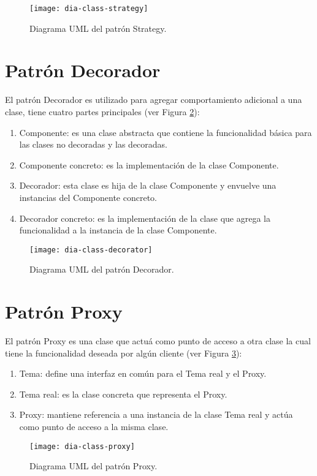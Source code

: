 \begin{figure}[h]
  \centering
  \texttt{[image: dia-class-strategy]}
  \caption{Diagrama UML del patrón Strategy\cite{DesignPatternsLasater}.}
  \label{fig:dia-class-strategy}
\end{figure}

\section{Patrón Decorador}
El patrón Decorador es utilizado para agregar comportamiento adicional a una clase, tiene cuatro partes principales\cite{DesignPatternsLasater} (ver Figura \ref{fig:dia-class-decorator}):
\begin{enumerate}
  \item Componente: es una clase abstracta que contiene la funcionalidad básica para las clases no decoradas y las decoradas.
  \item Componente concreto: es la implementación de la clase Componente.
  \item Decorador: esta clase es hija de la clase Componente y envuelve una instancias del Componente concreto.
  \item Decorador concreto: es la implementación de la clase que agrega la funcionalidad a la instancia de la clase Componente.
\end{enumerate}

\begin{figure}[h]
  \centering
  \texttt{[image: dia-class-decorator]}
  \caption{Diagrama UML del patrón Decorador\cite{DesignPatternsLasater}.}
  \label{fig:dia-class-decorator}
\end{figure}

\section{Patrón Proxy}
El patrón Proxy es una clase que actuá como punto de acceso a otra clase la cual tiene la funcionalidad deseada por algún cliente\cite{DesignPatternsLasater} (ver Figura \ref{fig:dia-class-proxy}):
\begin{enumerate}
  \item Tema: define una interfaz en común para el Tema real y el Proxy.
  \item Tema real: es la clase concreta que representa el Proxy.
  \item Proxy: mantiene referencia a una instancia de la clase Tema real y actúa como punto de acceso a la misma clase.
\end{enumerate}
\begin{figure}[h]
  \centering
  \texttt{[image: dia-class-proxy]}
  \caption{Diagrama UML del patrón Proxy\cite{DesignPatternsLasater}.}
  \label{fig:dia-class-proxy}
\end{figure}


